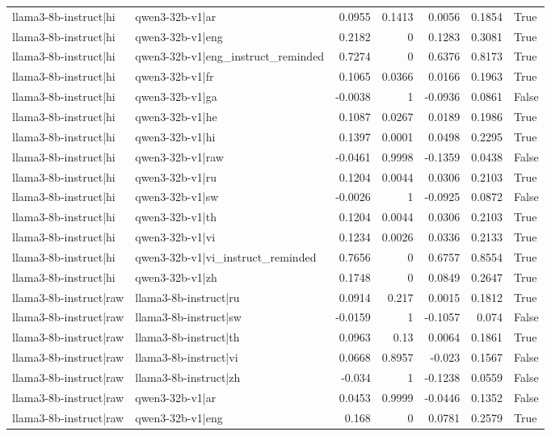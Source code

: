 \begin{table}
\begin{tabular}{l l r r r r l}
llama3-8b-instruct|hi & qwen3-32b-v1|ar & 0.0955 & 0.1413 & 0.0056 & 0.1854 & True \\
llama3-8b-instruct|hi & qwen3-32b-v1|eng & 0.2182 & 0 & 0.1283 & 0.3081 & True \\
llama3-8b-instruct|hi & qwen3-32b-v1|eng_instruct_reminded & 0.7274 & 0 & 0.6376 & 0.8173 & True \\
llama3-8b-instruct|hi & qwen3-32b-v1|fr & 0.1065 & 0.0366 & 0.0166 & 0.1963 & True \\
llama3-8b-instruct|hi & qwen3-32b-v1|ga & -0.0038 & 1 & -0.0936 & 0.0861 & False \\
llama3-8b-instruct|hi & qwen3-32b-v1|he & 0.1087 & 0.0267 & 0.0189 & 0.1986 & True \\
llama3-8b-instruct|hi & qwen3-32b-v1|hi & 0.1397 & 0.0001 & 0.0498 & 0.2295 & True \\
llama3-8b-instruct|hi & qwen3-32b-v1|raw & -0.0461 & 0.9998 & -0.1359 & 0.0438 & False \\
llama3-8b-instruct|hi & qwen3-32b-v1|ru & 0.1204 & 0.0044 & 0.0306 & 0.2103 & True \\
llama3-8b-instruct|hi & qwen3-32b-v1|sw & -0.0026 & 1 & -0.0925 & 0.0872 & False \\
llama3-8b-instruct|hi & qwen3-32b-v1|th & 0.1204 & 0.0044 & 0.0306 & 0.2103 & True \\
llama3-8b-instruct|hi & qwen3-32b-v1|vi & 0.1234 & 0.0026 & 0.0336 & 0.2133 & True \\
llama3-8b-instruct|hi & qwen3-32b-v1|vi_instruct_reminded & 0.7656 & 0 & 0.6757 & 0.8554 & True \\
llama3-8b-instruct|hi & qwen3-32b-v1|zh & 0.1748 & 0 & 0.0849 & 0.2647 & True \\
llama3-8b-instruct|raw & llama3-8b-instruct|ru & 0.0914 & 0.217 & 0.0015 & 0.1812 & True \\
llama3-8b-instruct|raw & llama3-8b-instruct|sw & -0.0159 & 1 & -0.1057 & 0.074 & False \\
llama3-8b-instruct|raw & llama3-8b-instruct|th & 0.0963 & 0.13 & 0.0064 & 0.1861 & True \\
llama3-8b-instruct|raw & llama3-8b-instruct|vi & 0.0668 & 0.8957 & -0.023 & 0.1567 & False \\
llama3-8b-instruct|raw & llama3-8b-instruct|zh & -0.034 & 1 & -0.1238 & 0.0559 & False \\
llama3-8b-instruct|raw & qwen3-32b-v1|ar & 0.0453 & 0.9999 & -0.0446 & 0.1352 & False \\
llama3-8b-instruct|raw & qwen3-32b-v1|eng & 0.168 & 0 & 0.0781 & 0.2579 & True \\

\end{tabular}
\end{table}
